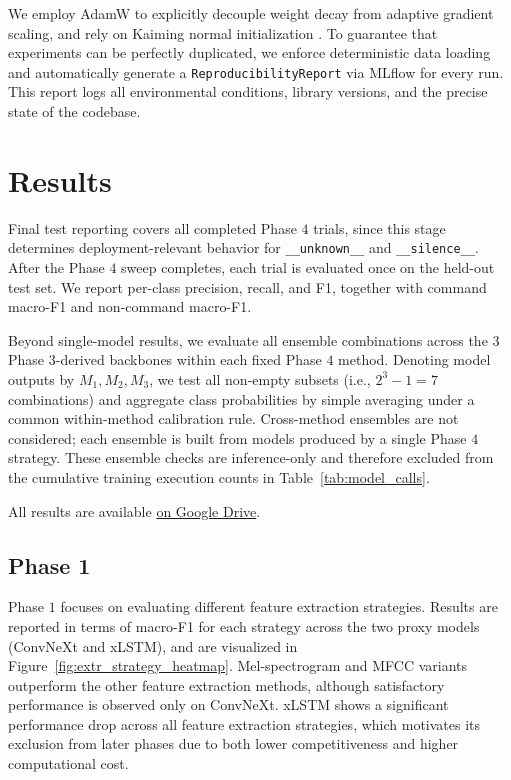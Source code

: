 \documentclass[cameraready]{Interspeech}
\begin{document}
We employ AdamW \cite{loshchilov2019adamw} to explicitly decouple weight decay from adaptive gradient scaling, and rely on Kaiming normal initialization \cite{he2015delving}. To guarantee that experiments can be perfectly duplicated, we enforce deterministic data loading and automatically generate a \texttt{ReproducibilityReport} via MLflow \cite{zaharia2018accelerating} for every run. This report logs all environmental conditions, library versions, and the precise state of the codebase.

\section{Results}
Final test reporting covers all completed Phase $4$ trials, since this stage determines deployment-relevant behavior for \texttt{\_\_unknown\_\_} and \texttt{\_\_silence\_\_}. After the Phase $4$ sweep completes, each trial is evaluated once on the held-out test set. We report per-class precision, recall, and F1, together with command macro-F1 and non-command macro-F1.

Beyond single-model results, we evaluate all ensemble combinations across the $3$ Phase $3$-derived backbones within each fixed Phase $4$ method. Denoting model outputs by $M_1, M_2, M_3$, we test all non-empty subsets (i.e., $2^3 - 1 = 7$ combinations) and aggregate class probabilities by simple averaging under a common within-method calibration rule. Cross-method ensembles are not considered; each ensemble is built from models produced by a single Phase $4$ strategy. These ensemble checks are inference-only and therefore excluded from the cumulative training execution counts in Table~\ref{tab:model_calls}.

All results are available \href{https://drive.google.com/drive/folders/1-1eHoHBH44WIyfvjSrMm4dskzo3MDMuM}{on Google Drive}.

\subsection{Phase 1}
\label{sec:phase1}
Phase $1$ focuses on evaluating different feature extraction strategies. Results are reported in terms of macro-F1 for each strategy across the two proxy models (ConvNeXt and xLSTM), and are visualized in Figure~\ref{fig:extr_strategy_heatmap}. Mel-spectrogram and MFCC variants outperform the other feature extraction methods, although satisfactory performance is observed only on ConvNeXt. xLSTM shows a significant performance drop across all feature extraction strategies, which motivates its exclusion from later phases due to both lower competitiveness and higher computational cost.
\end{document}
